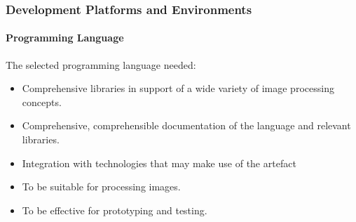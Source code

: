 \documentclass[a4paper, 12pt]{report}
\begin{document}


\subsubsection{Development Platforms and Environments}

\paragraph{Programming Language}
The selected programming language needed:
\begin{itemize}
    \item Comprehensive libraries in support of a wide variety of image processing concepts.
    \item Comprehensive, comprehensible documentation of the language and relevant libraries.
    \item Integration with technologies that may make use of the artefact
    \item To be suitable for processing images.
    \item To be effective for prototyping and testing.
\end{itemize}
\end{document}
